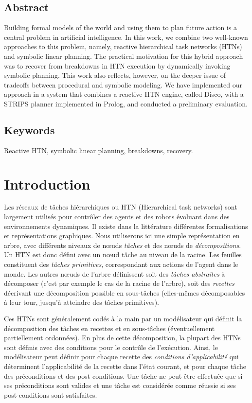 \documentclass[a4paper,twoside,french]{article}
\begin{document}
				\subsection*{Abstract}
				Building formal models of the world and using them to plan future
				action is a central problem in artificial intelligence.  In this
				work, we combine two well-known approaches to this problem, namely,
				reactive hierarchical task networks (HTNs) and symbolic linear
				planning.  The practical motivation for this hybrid approach was to
				recover from breakdowns in HTN execution by dynamically invoking
				symbolic planning.  This work also reflects, however, on the deeper
				issue of tradeoffs between procedural and symbolic modeling.  We
				have implemented our approach in a system that combines a reactive
				HTN engine, called Disco, with a STRIPS planner implemented in
				Prolog, and conducted a preliminary evaluation.
				\subsection*{Keywords}
				Reactive HTN, symbolic linear planning, breakdowns, recovery.
				
				
		\section{Introduction}
		Les r\'eseaux de t\^aches hi\'erarchiques ou HTN \cite{erol1994htn} (Hierarchical task networks) sont largement utilis\'es pour contr\^oler des agents et des robots \'evoluant dans des environnements dynamiques. Il existe dans la litt\'erature diff\'erentes formalisations et repr\'esentations graphiques. Nous utiliserons ici une simple repr\'esentation en arbre, avec  différents niveaux de  n\oe uds {\em tâches}  et des  n\oe uds de {\em décompositions}. Un HTN est donc défini avec un n\oe ud tâche au niveau de la racine. Les feuilles constituent des {\em tâches primitives}, correspondant aux actions de l'agent dans le monde. Les autres n\oe uds de l'arbre définissent soit des {\em tâches abstraites} à décomposer (c'est par exemple le cas de la racine de l'arbre), soit des \emph{recettes} décrivant une décomposition possible en sous-tâches (elles-mêmes décomposables à leur tour, jusqu'à atteindre des tâches primitives).

		\par Ces HTNs sont g\'en\'eralement cod\'es \`a la main par un modélisateur qui définit la décomposition des tâches en recettes et en sous-tâches (éventuellement partiellement ordonn\'ees). En plus de cette d\'ecomposition, la plupart des HTNs sont d\'efinis avec des conditions pour le contrôle de l'exécution. Ainsi, le modélisateur peut définir pour chaque recette des \emph{conditions d'applicabilité} qui déterminent l'applicabilité de la recette dans l'état courant, et pour chaque tâche des pr\'econditions et des post-conditions. Une tâche ne peut être effectuée que si ses préconditions sont valides et une tâche est considérée comme réussie si ses post-conditions sont satisfaites.
						
\end{document}

